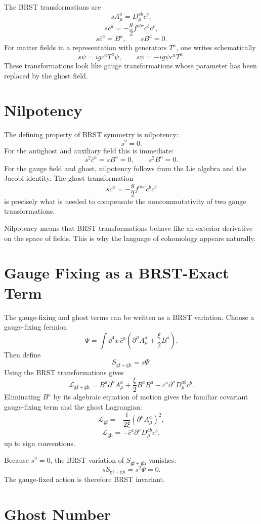 The BRST transformations are
\[
    sA_\mu^a=D_\mu^{ab}c^b,
\]
\[
    sc^a=-\frac{g}{2}f^{abc}c^b c^c,
\]
\[
    s\bar c^a=B^a,
    \qquad
    sB^a=0.
\]
For matter fields in a representation with generators \(T^a\), one writes
schematically
\[
    s\psi=igc^aT^a\psi,
    \qquad
    s\bar\psi=-ig\bar\psi c^aT^a.
\]
These transformations look like gauge transformations whose parameter has been
replaced by the ghost field.

\section{Nilpotency}

The defining property of BRST symmetry is nilpotency:
\[
    s^2=0.
\]
For the antighost and auxiliary field this is immediate:
\[
    s^2\bar c^a=sB^a=0,
    \qquad
    s^2B^a=0.
\]
For the gauge field and ghost, nilpotency follows from the Lie algebra and the
Jacobi identity. The ghost transformation
\[
    sc^a=-\frac{g}{2}f^{abc}c^b c^c
\]
is precisely what is needed to compensate the noncommutativity of two gauge
transformations.

Nilpotency means that BRST transformations behave like an exterior derivative
on the space of fields. This is why the language of cohomology appears naturally.

\section{Gauge Fixing as a BRST-Exact Term}

The gauge-fixing and ghost terms can be written as a BRST variation. Choose a
gauge-fixing fermion
\[
    \Psi=\int\dd^4x\,\bar c^a
    \left(\partial^\mu A_\mu^a+\frac{\xi}{2}B^a\right).
\]
Then define
\[
    S_{\mathrm{gf+gh}}=s\Psi.
\]
Using the BRST transformations gives
\[
    \mathcal{L}_{\mathrm{gf+gh}}
    = B^a\partial^\mu A_\mu^a+\frac{\xi}{2}B^aB^a
      -\bar c^a\partial^\mu D_\mu^{ab}c^b.
\]
Eliminating \(B^a\) by its algebraic equation of motion gives the familiar
covariant gauge-fixing term and the ghost Lagrangian:
\[
    \mathcal{L}_{\mathrm{gf}}
    = -\frac{1}{2\xi}(\partial^\mu A_\mu^a)^2,
\]
\[
    \mathcal{L}_{\mathrm{gh}}
    = -\bar c^a\partial^\mu D_\mu^{ab}c^b,
\]
up to sign conventions.

Because \(s^2=0\), the BRST variation of \(S_{\mathrm{gf+gh}}\) vanishes:
\[
    sS_{\mathrm{gf+gh}}=s^2\Psi=0.
\]
The gauge-fixed action is therefore BRST invariant.

\section{Ghost Number}

